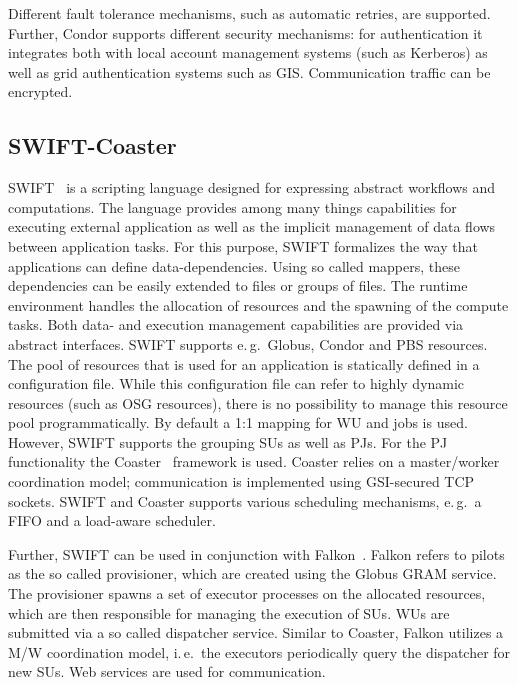 \documentclass[conference,final]{IEEEtran}
\newcommand{\upp}{\vspace*{-0.5em}}
\begin{document}
Different fault tolerance mechanisms, such as automatic retries, are supported.
Further, Condor supports different security mechanisms: for authentication it
integrates both with local account management systems (such as Kerberos) as well
as grid authentication systems such as GIS. Communication traffic can be
encrypted.


\upp
\subsection{SWIFT-Coaster\upp\upp}

SWIFT~\cite{Wilde2011} is a scripting language designed for expressing abstract
workflows and computations. The language provides among many things capabilities
for executing external application as well as the implicit management of data
flows between application tasks. For this purpose, SWIFT formalizes the way that
applications can define data-dependencies. Using so called mappers, these
dependencies can be easily extended to files or groups of files. The runtime
environment handles the allocation of resources and the spawning of the compute
tasks. Both data- and execution management capabilities are provided via
abstract interfaces. SWIFT supports e.\,g.\ Globus, Condor and PBS resources.
The pool of resources that is used for an application is statically defined in a
configuration file. While this configuration file can refer to highly dynamic
resources (such as OSG resources), there is no possibility to manage this
resource pool programmatically. By default a 1:1 mapping for WU and jobs is
used. However, SWIFT supports the grouping SUs as well as PJs. For the PJ
functionality the Coaster~\cite{coasters} framework is used. Coaster relies on a
master/worker coordination model; communication is implemented using GSI-secured
TCP sockets. SWIFT and Coaster supports various scheduling mechanisms, e.\,g.\ 
a FIFO and a load-aware scheduler. 

Further, SWIFT can be used in conjunction with Falkon~\cite{1362680}. Falkon
refers to pilots as the so called provisioner, which are created using the
Globus GRAM service. The provisioner spawns a set of executor processes on the
allocated resources, which are then responsible for managing the execution of
SUs. WUs are submitted via a so called dispatcher service. Similar to Coaster,
Falkon utilizes a M/W coordination model, i.\,e.\ the executors periodically
query the dispatcher for new SUs. Web services are used for communication.
\end{document}
